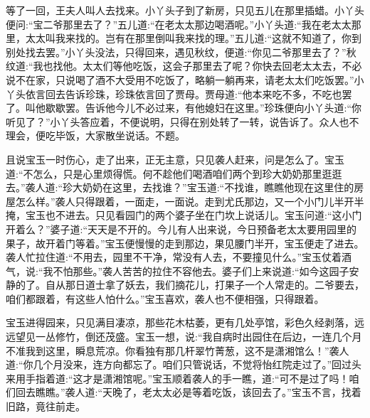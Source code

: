 \begin{parag}
\end{parag}


\begin{parag}
    等了一回，王夫人叫人去找来。小丫头子到了新房，只见五儿在那里插蜡。小丫头便问:“宝二爷那里去了？”五儿道:“在老太太那边喝酒呢。”小丫头道:“我在老太太那里，太太叫我来找的。岂有在那里倒叫我来找的理。”五儿道:“这就不知道了，你到别处找去罢。”小丫头没法，只得回来，遇见秋纹，便道:“你见二爷那里去了？”秋纹道:“我也找他。太太们等他吃饭，这会子那里去了呢？你快去回老太太去，不必说不在家，只说喝了酒不大受用不吃饭了，略躺一躺再来，请老太太们吃饭罢。”小丫头依言回去告诉珍珠，珍珠依言回了贾母。贾母道:“他本来吃不多，不吃也罢了。叫他歇歇罢。告诉他今儿不必过来，有他媳妇在这里。”珍珠便向小丫头道:“你听见了？”小丫头答应着，不便说明，只得在别处转了一转，说告诉了。众人也不理会，便吃毕饭，大家散坐说话。不题。
\end{parag}


\begin{parag}
    且说宝玉一时伤心，走了出来，正无主意，只见袭人赶来，问是怎么了。宝玉道:“不怎么，只是心里烦得慌。何不趁他们喝酒咱们两个到珍大奶奶那里逛逛去。”袭人道:“珍大奶奶在这里，去找谁？”宝玉道:“不找谁，瞧瞧他现在这里住的房屋怎么样。”袭人只得跟着，一面走，一面说。走到尤氏那边，又一个小门儿半开半掩，宝玉也不进去。只见看园门的两个婆子坐在门坎上说话儿。宝玉问道:“这小门开着么？”婆子道:“天天是不开的。今儿有人出来说，今日预备老太太要用园里的果子，故开着门等着。”宝玉便慢慢的走到那边，果见腰门半开，宝玉便走了进去。袭人忙拉住道:“不用去，园里不干净，常没有人去，不要撞见什么。”宝玉仗着酒气，说:“我不怕那些。”袭人苦苦的拉住不容他去。婆子们上来说道:“如今这园子安静的了。自从那日道士拿了妖去，我们摘花儿，打果子一个人常走的。二爷要去，咱们都跟着，有这些人怕什么。”宝玉喜欢，袭人也不便相强，只得跟着。
\end{parag}


\begin{parag}
    宝玉进得园来，只见满目凄凉，那些花木枯萎，更有几处亭馆，彩色久经剥落，远远望见一丛修竹，倒还茂盛。宝玉一想，说:“我自病时出园住在后边，一连几个月不准我到这里，瞬息荒凉。你看独有那几杆翠竹菁葱，这不是潇湘馆么！”袭人道:“你几个月没来，连方向都忘了。咱们只管说话，不觉将怡红院走过了。”回过头来用手指着道:“这才是潇湘馆呢。”宝玉顺着袭人的手一瞧，道:“可不是过了吗！咱们回去瞧瞧。”袭人道:“天晚了，老太太必是等着吃饭，该回去了。”宝玉不言，找着旧路，竟往前走。
\end{parag}


